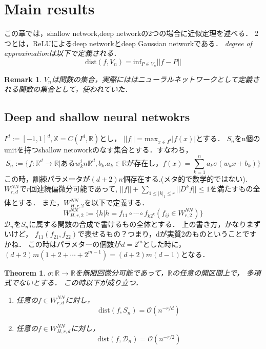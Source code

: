 \documentclass{ujarticle}
\newtheorem{thm}{Theorem}[section]
\newtheorem*{rem}{Remark}
\begin{document}
\section{Main results}
\label{sec:Main results}
この章では，shallow network,deep networkの2つの場合に近似定理を述べる．
2つとは，ReLUによるdeep networkとdeep Gaussian networkである．
\it{degree of approximation}は以下で定義される．
\begin{equation}
　\mathrm{dist}(f,V_n)= \mathrm{inf}_{P \in V_n}||f - P||
\end{equation}
\begin{rem}
 $V_n$は関数の集合，実際にははニューラルネットワークとして定義される関数の集合として，使われていた．

\end{rem}
\subsection{Deep and shallow neural netwokrs}
\label{sub:Deep and shallow neural netwokrs}
$I^d:=[-1,1]^d,\mathbb{X}=C(I^d,\mathbb{R})$とし，
$||f||=\mathrm{max}_{x \in I^d}|f(x)|$とする．
$S_n$をn個のunitを持つshallow netoworkのなす集合とする．すなわち，
\begin{equation*}
 S_n:=\{f:\mathbb{R}^d \to \mathbb{R}|\mbox{ある}w_k ^in \mathbb{R}^d,b_k.a_k
 \in \mathbb{R}\mbox{が存在し，}f(x)=\sum_{k=1}^na_k \sigma(w_kx+b_k) \}
\end{equation*}
この時，訓練パラメータが$(d+2)n$個存在する.(メタ的で数学的ではない).
$W_{r,d}^{NN}$で$r$回連続偏微分可能であって,
$||f||+\sum_{1 \le |k|_1 \le r}||D^kf|| \le 1$を満たすもの全体とする．
また，$W_{H,r,2}^{NN}$を以下で定義する．
\begin{equation*}
  W_{H,r,2}^{NN}:=\{h | h=f_{11} \circ \cdots \circ f_{k2^k} (f_{ij} \in W_{r,2}^{NN})\}
\end{equation*}
$\mathcal{D}_n$を$S_n$に属する関数の合成で書けるもの全体とする．
上の書き方，かなりまずいけど， $f_11(f_21,f_22)$で表せるもの？つまり，dが実質2のものということですかね．
この時はパラメターの個数が$d=2^m$とした時に，$(d+2)m(1 + 2 + \cdots +2^{m-1})=(d+2)m(d-1)$となる．
\begin{thm}
 $\sigma :\mathbb{R} \to \mathbb{R}$を無限回微分可能であって，$\mathbb{R}$の任意の開区間上で，
 多項式でないとする． この時以下が成り立つ．
 \begin{enumerate}
   \item 任意の$f \in W_{r,d}^{NN}$に対し，
   \begin{equation}
     \mathrm{dist}(f,S_n)= \mathcal{O}(n^{-r/d})
   \end{equation}
   \item 任意の$f \in W_{H,r,d}^{NN}$に対し，
   \begin{equation}
     \mathrm{dist}(f,\mathcal{D}_n)=\mathcal{O}(n^{-r/2})
   \end{equation}
 \end{enumerate}
\end{thm}
\end{document}
